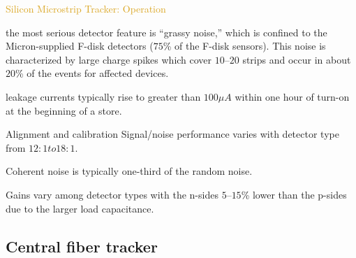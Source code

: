 \begin{frame}{\textcolor{Goldenrod}{Silicon Microstrip Tracker: Operation}}
\begin{overlayarea}{\textwidth}{\textheight}
  
\item the most serious detector feature is “grassy noise,”
  which is confined to the Micron-supplied F-disk
  detectors ($75$\% of the F-disk sensors). This noise is characterized
  by large charge spikes which cover $10–20$ strips and
  occur in about $20$\% of the events for affected
  devices.
  
\item leakage currents typically rise to
  greater than $100 \mu A$ within one hour of turn-on at
  the beginning of a store.
  
\item Alignment and calibration Signal/noise performance varies with
  detector type from $12:1 to 18:1$.
  
\item Coherent noise is typically one-third
  of the random noise.
  
\item Gains vary among detector types
  with the n-sides $5–15$\% lower than the p-sides due to the larger load
  capacitance.
  \tti
  
\end{overlayarea}
\end{frame}


\subsection{Central fiber tracker}


